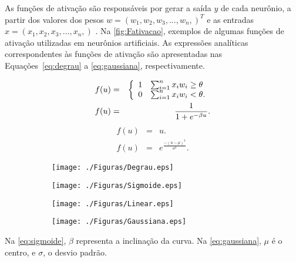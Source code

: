 As funções de ativação são responsáveis por gerar a saída $y$ de cada neurônio, a partir dos valores dos pesos $w = (w_1,w_2,w_3,...,w_n,)^T$ e as entradas $x = (x_1,x_2,x_3,...,x_n,)$ \cite{book:braga2007}. Na \autoref{fig:Fativacao}, exemplos de algumas funções de ativação utilizadas em neurônios artificiais. As expressões analíticas correspondentes às funções de ativação são apresentadas nas Equações~\ref{eq:degrau} a \ref{eq:gaussiana}, respectivamente.



\begin{eqnarray}
f(u) &=& \left\{ 
\begin{array}{l l}
1 & \sum_{i=1}^n x_iw_i \ge \theta  \label{eq:degrau}\\
0 & \sum_{i=1}^n x_iw_i < \theta{.}
\end{array} \right. \\
f(u) &=& \frac{1}{1+e^{-\beta{u}}}.  \label{eq:sigmoide}
\end{eqnarray}
\begin{eqnarray}
f(u) &=& u.                          \label{eq:linear}\\
f(u) &=& e^{\frac{-(u-\mu)^2}{\sigma^2}}. \label{eq:gaussiana}
\end{eqnarray}

\begin{figure}[H]
	\caption{Exemplos de funções de ativação.}\label{fig:Fativacao}
	\begin{subfigure}[b]{.5\linewidth}
		\centering
		\label{fig:degrau}
		\texttt{[image: ./Figuras/Degrau.eps]}
	\end{subfigure}
	\begin{subfigure}[b]{.5\linewidth}
		\centering
		\label{fig:sigmoide}
		\texttt{[image: ./Figuras/Sigmoide.eps]}
	\end{subfigure}
	\begin{subfigure}[b]{.5\linewidth}
		\centering
		\label{fig:linear}
		\texttt{[image: ./Figuras/Linear.eps]}
	\end{subfigure}
	\begin{subfigure}[b]{.5\linewidth}
		\centering
		\label{fig:gaussiana}       
		\texttt{[image: ./Figuras/Gaussiana.eps]}
	\end{subfigure}
\end{figure}




Na \autoref{eq:sigmoide}, $\beta$ representa a inclinação da curva. Na \autoref{eq:gaussiana}, $\mu$ é o centro, e $\sigma$, o desvio padrão.


